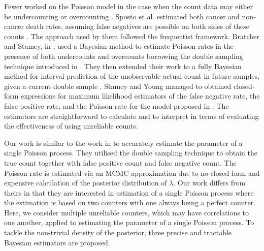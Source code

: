 Fewer worked on the Poisson model in the case when the count data may either be undercounting or overcounting \cite{sposto1992, bratcher2002, bratcher2004, stamey2005}. Sposto et al. estimated both cancer and non-cancer death rates, assuming false negatives are possible on both sides of these counts \cite{sposto1992}. The approach used by them followed the frequentist framework. Bratcher and Stamey, in \cite{bratcher2002}, used a Bayesian method to estimate Poisson rates in the presence of both undercounts and overcounts borrowing the double sampling technique introduced in \cite{Tenenbein1970}. They then extended their work to a fully Bayesian method for interval prediction of the unobservable actual count in future samples, given a current double sample \cite{bratcher2004}. Stamey and Young \cite{stamey2005} managed to obtained closed-form expressions for maximum likelihood estimators of the false negative rate, the false positive rate, and the Poisson rate for the model proposed in \cite{bratcher2002}. The estimators are straightforward to calculate and to interpret in terms of evaluating the effectiveness of using unreliable counts.

Our work is similar to the work in \cite{bratcher2002} to accurately estimate the parameter of a single Poisson process. They utilised the double sampling technique to obtain the true count together with false positive count and false negative count. The Poisson rate is estimated via an MCMC approximation due to no-closed form and expensive calculation of the posterior distribution of $\lambda$. Our work differs from theirs in that they are interested in estimation of a single Poisson process where the estimation is based on two counters with one always being a perfect counter. Here, we consider multiple unreliable counters, which may have correlations to one another, applied to estimating the parameter of a single Poisson process. To tackle the non-trivial density of the posterior, three precise and tractable Bayesian estimators are proposed. 


